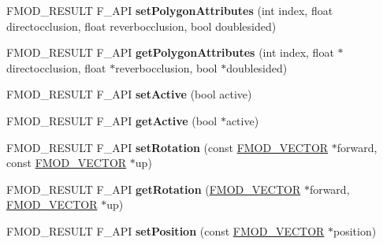 \begin{DoxyCompactItemize}
\item 
\hypertarget{class_f_m_o_d_1_1_geometry_a4a33620a607eefbaaa0e482c64c4151d}{F\+M\+O\+D\+\_\+\+R\+E\+S\+U\+L\+T F\+\_\+\+A\+P\+I {\bfseries set\+Polygon\+Attributes} (int index, float directocclusion, float reverbocclusion, bool doublesided)}\label{class_f_m_o_d_1_1_geometry_a4a33620a607eefbaaa0e482c64c4151d}

\item 
\hypertarget{class_f_m_o_d_1_1_geometry_ac3eb9f887e2bfcb0e7f7080ee3decf03}{F\+M\+O\+D\+\_\+\+R\+E\+S\+U\+L\+T F\+\_\+\+A\+P\+I {\bfseries get\+Polygon\+Attributes} (int index, float $\ast$directocclusion, float $\ast$reverbocclusion, bool $\ast$doublesided)}\label{class_f_m_o_d_1_1_geometry_ac3eb9f887e2bfcb0e7f7080ee3decf03}

\item 
\hypertarget{class_f_m_o_d_1_1_geometry_aa12f6ef6232eead759d86d37b5bcd65f}{F\+M\+O\+D\+\_\+\+R\+E\+S\+U\+L\+T F\+\_\+\+A\+P\+I {\bfseries set\+Active} (bool active)}\label{class_f_m_o_d_1_1_geometry_aa12f6ef6232eead759d86d37b5bcd65f}

\item 
\hypertarget{class_f_m_o_d_1_1_geometry_a421b1e652492dcf253b532c625730671}{F\+M\+O\+D\+\_\+\+R\+E\+S\+U\+L\+T F\+\_\+\+A\+P\+I {\bfseries get\+Active} (bool $\ast$active)}\label{class_f_m_o_d_1_1_geometry_a421b1e652492dcf253b532c625730671}

\item 
\hypertarget{class_f_m_o_d_1_1_geometry_abe45900e1c2023f19b6d781a9c28b13a}{F\+M\+O\+D\+\_\+\+R\+E\+S\+U\+L\+T F\+\_\+\+A\+P\+I {\bfseries set\+Rotation} (const \hyperlink{struct_f_m_o_d___v_e_c_t_o_r}{F\+M\+O\+D\+\_\+\+V\+E\+C\+T\+O\+R} $\ast$forward, const \hyperlink{struct_f_m_o_d___v_e_c_t_o_r}{F\+M\+O\+D\+\_\+\+V\+E\+C\+T\+O\+R} $\ast$up)}\label{class_f_m_o_d_1_1_geometry_abe45900e1c2023f19b6d781a9c28b13a}

\item 
\hypertarget{class_f_m_o_d_1_1_geometry_ad813365cbc9b9ac89ad05de2853712bd}{F\+M\+O\+D\+\_\+\+R\+E\+S\+U\+L\+T F\+\_\+\+A\+P\+I {\bfseries get\+Rotation} (\hyperlink{struct_f_m_o_d___v_e_c_t_o_r}{F\+M\+O\+D\+\_\+\+V\+E\+C\+T\+O\+R} $\ast$forward, \hyperlink{struct_f_m_o_d___v_e_c_t_o_r}{F\+M\+O\+D\+\_\+\+V\+E\+C\+T\+O\+R} $\ast$up)}\label{class_f_m_o_d_1_1_geometry_ad813365cbc9b9ac89ad05de2853712bd}

\item 
\hypertarget{class_f_m_o_d_1_1_geometry_a36ca90c62cbc0c37938a51750ce865e7}{F\+M\+O\+D\+\_\+\+R\+E\+S\+U\+L\+T F\+\_\+\+A\+P\+I {\bfseries set\+Position} (const \hyperlink{struct_f_m_o_d___v_e_c_t_o_r}{F\+M\+O\+D\+\_\+\+V\+E\+C\+T\+O\+R} $\ast$position)}\label{class_f_m_o_d_1_1_geometry_a36ca90c62cbc0c37938a51750ce865e7}


\end{DoxyCompactItemize}
